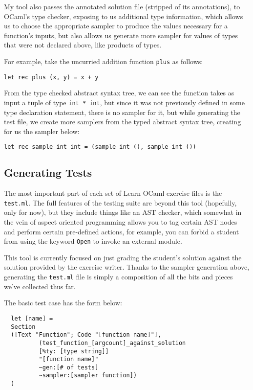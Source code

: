 \documentclass[11pt]{article}
\begin{document}
My tool also passes the annotated solution file (stripped of its annotations), to OCaml's type checker, exposing to us additional type information, which allows us to choose the appropriate sampler to produce the values necessary for a function's inputs, but also allows us generate more sampler for values of types that were not declared above, like products of types.

For example, take the uncurried addition function \verb+plus+ as follows:
\begin{lstlisting}
let rec plus (x, y) = x + y
\end{lstlisting}

From the type checked abstract syntax tree, we can see the function takes as input a tuple of type \verb+int * int+, but since it was not previously defined in some type declaration statement, there is no sampler for it, but while generating the test file, we create more samplers from the typed abstract syntax tree, creating for us the sampler below:

\begin{lstlisting}
let rec sample_int_int = (sample_int (), sample_int ())
\end{lstlisting}

\subsection{Generating Tests}
The most important part of each set of Learn OCaml exercise files is the \verb+test.ml+. The full features of the testing suite are beyond this tool (hopefully, only for now), but they include things like an AST checker, which somewhat in the vein of aspect oriented programming allows you to tag certain AST nodes and perform certain pre-defined actions, for example, you can forbid a student from using the keyword \verb+Open+ to invoke an external module.

This tool is currently focused on just grading the student's solution against the solution provided by the exercise writer. Thanks to the sampler generation above, generating the \verb+test.ml+ file is simply a composition of all the bits and pieces we've collected thus far.

The basic test case has the form below:

\begin{lstlisting}
  let [name] =
  Section
  ([Text "Function"; Code "[function name]"],
          (test_function_[argcount]_against_solution
          [%ty: [type string]]
          "[function name]"
          ~gen:[# of tests]
          ~sampler:[sampler function])
  )
\end{lstlisting}
\end{document}
